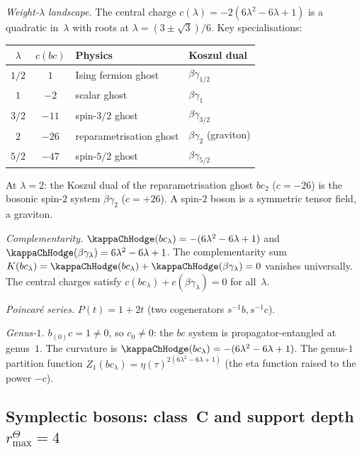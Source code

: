 \begin{computation}
\smallskip
\noindent
\emph{Weight-$\lambda$ landscape.}
The central charge
$c(\lambda) = -2(6\lambda^2 - 6\lambda + 1)$ is a quadratic
in~$\lambda$ with roots at $\lambda = (3 \pm \sqrt{3})/6$.
Key specialisations:
\begin{center}
\small
\renewcommand{\arraystretch}{1.3}
\begin{tabular}{ccll}
\toprule
$\lambda$ & $c(bc)$ & \textbf{Physics} & \textbf{Koszul dual} \\
\midrule
$1/2$ & $1$ & Ising fermion ghost & $\beta\gamma_{1/2}$ \\
$1$ & $-2$ & scalar ghost & $\beta\gamma_1$ \\
$3/2$ & $-11$ & spin-$3/2$ ghost & $\beta\gamma_{3/2}$ \\
$2$ & $-26$ & reparametrisation ghost & $\beta\gamma_2$ (graviton) \\
$5/2$ & $-47$ & spin-$5/2$ ghost & $\beta\gamma_{5/2}$ \\
\bottomrule
\end{tabular}
\end{center}
At $\lambda = 2$: the Koszul dual of the reparametrisation
ghost $bc_2$ ($c = -26$) is the bosonic spin-$2$ system
$\beta\gamma_2$ ($c = +26$). A spin-$2$ boson is a
symmetric tensor field, a graviton.

\smallskip
\noindent
\emph{Complementarity.}
$\kappaChHodge(bc_\lambda) = -(6\lambda^2 - 6\lambda + 1)$ and
$\kappaChHodge(\beta\gamma_\lambda) = 6\lambda^2 - 6\lambda + 1$.
The complementarity sum
$K(bc_\lambda) = \kappaChHodge(bc_\lambda) + \kappaChHodge(\beta\gamma_\lambda) = 0$
vanishes universally. The central charges satisfy
$c(bc_\lambda) + c(\beta\gamma_\lambda) = 0$ for all~$\lambda$.

\smallskip
\noindent
\emph{Poincar\'{e} series.}
$P(t) = 1 + 2t$ (two cogenerators $s^{-1}b, s^{-1}c$).

\smallskip
\noindent
\emph{Genus-$1$.}
$b_{(0)}c = 1 \ne 0$, so $c_0 \ne 0$: the $bc$ system is
propagator-entangled at genus~$1$. The curvature is
$\kappaChHodge(bc_\lambda) = -(6\lambda^2 - 6\lambda + 1)$. The genus-$1$ partition function
$Z_1(bc_\lambda) = \eta(\tau)^{2(6\lambda^2-6\lambda+1)}$
(the eta function raised to the power $-c$).
\end{computation}

\subsection{Symplectic bosons: class~C and support depth $r^\Theta_{\max}=4$}%
\label{subsec:symplectic-boson-ordered-bar}%
%


